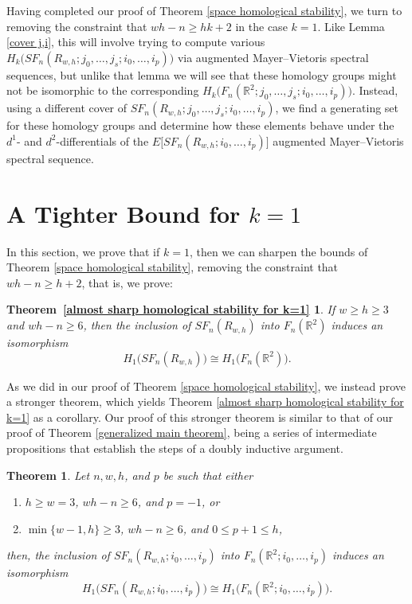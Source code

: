 \documentclass[pagebackref,colorlinks,citecolor=blue,linkcolor=blue,urlcolor=blue,filecolor=blue]{article}
\newtheorem*{T2}{Theorem~\ref{almost sharp homological stability for k=1}}
\newtheorem{thm}{Theorem}[section]
\theoremstyle{definition}\newtheorem{definition}[thm]{Definition}
\theoremstyle{definition}
\newcommand{\thmtextone}{
If $w\ge h \ge 3$ and $wh-n\ge 6$, then the inclusion of $SF_{n}(R_{w,h})$ into $F_{n}(\R^{2})$ induces an isomorphism
\[
H_{1}\big(SF_{n}(R_{w,h})\big)\cong H_{1}\big(F_{n}(\R^{2})\big).
\]
}
\newcommand{\R}{\ensuremath{\mathbb{R}}}
\begin{document}
Having completed our proof of Theorem \ref{space homological stability}, we turn to removing the constraint that $wh-n\ge hk+2$ in the case $k=1$.
Like Lemma \ref{cover j,i}, this will involve trying to compute various $H_{k}\big(SF_{n}(R_{w,h}; j_{0}, \dots,j_{s}; i_{0},\dots, i_{p})\big)$ via augmented Mayer--Vietoris spectral sequences, but unlike that lemma we will see that these homology groups might not be isomorphic to the corresponding $H_{k}\big(F_{n}(\R^{2}; j_{0}, \dots,j_{s}; i_{0},\dots, i_{p})\big)$.
Instead, using a different cover of $SF_{n}(R_{w,h}; j_{0}, \dots,j_{s}; i_{0},\dots, i_{p})$, we find a generating set for these homology groups and determine how these elements behave under the $d^{1}$- and $d^{2}$-differentials of the $E\big[SF_{n}(R_{w,h}; i_{0},\dots, i_{p})\big]$ augmented Mayer--Vietoris spectral sequence.

\section{A Tighter Bound for $k=1$}\label{tighter bound section}

In this section, we prove that if $k=1$, then we can sharpen the bounds of Theorem \ref{space homological stability}, removing the constraint that $wh-n\ge h+2$, that is, we prove:
\begin{T2}
  \thmtextone
\end{T2} 

As we did in our proof of Theorem \ref{space homological stability}, we instead prove a stronger theorem, which yields Theorem \ref{almost sharp homological stability for k=1} as a corollary.
Our proof of this stronger theorem is similar to that of our proof of Theorem \ref{generalized main theorem}, being a series of intermediate propositions that establish the steps of a doubly inductive argument.

\begin{thm}\label{k 1 bound p}
Let $n, w, h$, and $p$ be such that either
\begin{enumerate}
    \item $h\ge w=3$, $wh-n\ge 6$, and $p=-1$, or
    \item $\min\{w-1,h\}\ge 3$, $wh-n\ge 6$, and $0\le p+1\le h$,
\end{enumerate}
then, the inclusion of $SF_{n}(R_{w,h};i_{0},\dots, i_{p})$ into $F_{n}(\R^{2}; i_{0}, \dots, i_{p})$ induces an isomorphism
\[
H_{1}\big(SF_{n}(R_{w,h};i_{0},\dots, i_{p})\big)\cong H_{1}\big(F_{n}(\R^{2}; i_{0}, \dots, i_{p})\big).
\]
\end{thm}
\end{document}
